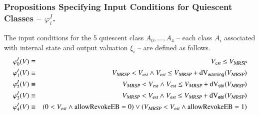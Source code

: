 \subsubsection{Propositions Specifying Input Conditions for Quiescent Classes -- $\varphi_i^I$.}
The input conditions for the 5 quiescent class $A_0,\dots,A_4$ -- each class $A_i$ 
associated with internal state and output valuation $\xi_i$ -- are defined as follows.
\footnotesize
\begin{eqnarray}
\label{eq:phiI0}
\varphi_0^I(V) &  \equiv  &  \vest \le \vmax
\\
\varphi_1^I(V) & \equiv  &  \vmax < \vest \wedge \vest \le \vmax + \dvw(\vmax) 
\\
\varphi_2^I(V) &  \equiv  &  \vmax < \vest \wedge \vest \le \vmax + \dvs(\vmax)  
 \\
\varphi_3^I(V) & \equiv &    \vmax < \vest \wedge \vest \le \vmax + \dve(\vmax)
\\ 
\label{eq:phiI4}
\varphi_4^I(V)  & \equiv &   (0 < \vest   \wedge \areb=0) \vee (\vmax < \vest  \wedge \areb=1)
\end{eqnarray}
\normalsize


